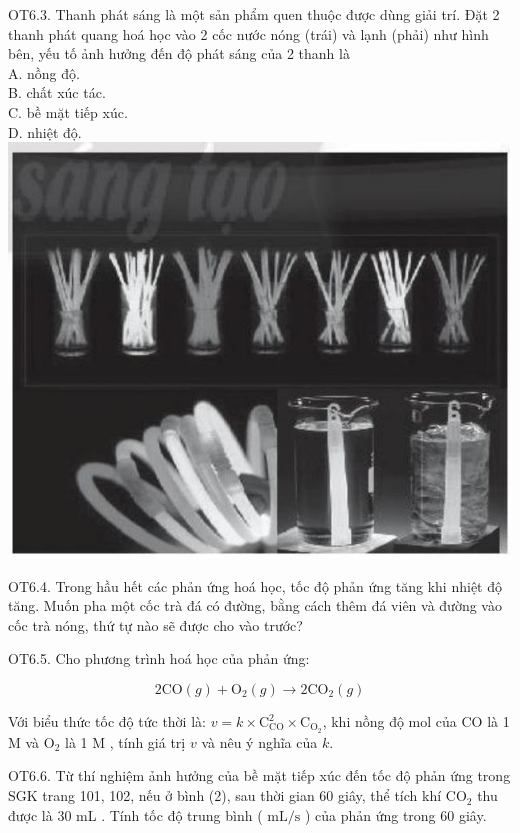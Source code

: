 \documentclass[10pt]{article}
\begin{document}
OT6.3. Thanh phát sáng là một sản phẩm quen thuộc được dùng giải trí. Đặt 2 thanh phát quang hoá học vào 2 cốc nước nóng (trái) và lạnh (phải) như hình bên, yếu tố ảnh hưởng đến độ phát sáng của 2 thanh là\\
A. nồng độ.\\
B. chất xúc tác.\\
C. bề mặt tiếp xúc.\\
D. nhiệt độ.\\
\includegraphics[max width=\textwidth, center]{2025_10_23_883c4b146e2332109fcdg-68(4)}

OT6.4. Trong hầu hết các phản ứng hoá học, tốc độ phản ứng tăng khi nhiệt độ tăng. Muốn pha một cốc trà đá có đường, bằng cách thêm đá viên và đường vào cốc trà nóng, thứ tự nào sẽ được cho vào trước?

OT6.5. Cho phương trình hoá học của phản ứng:

$$
2 \mathrm{CO}(g)+\mathrm{O}_{2}(g) \rightarrow 2 \mathrm{CO}_{2}(g)
$$

Với biểu thức tốc độ tức thời là: $v=k \times \mathrm{C}_{\mathrm{CO}}^{2} \times \mathrm{C}_{\mathrm{O}_{2}}$, khi nồng độ mol của CO là 1 M và $\mathrm{O}_{2}$ là 1 M , tính giá trị $v$ và nêu ý nghĩa của $k$.

OT6.6. Từ thí nghiệm ảnh hưởng của bề mặt tiếp xúc đến tốc độ phản ứng trong SGK trang 101, 102, nếu ở bình (2), sau thời gian 60 giây, thể tích khí $\mathrm{CO}_{2}$ thu được là 30 mL . Tính tốc độ trung bình ( $\mathrm{mL} / \mathrm{s}$ ) của phản ứng trong 60 giây.
\end{document}
